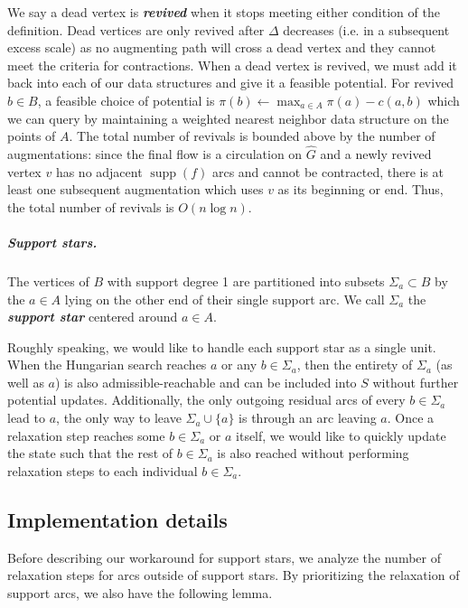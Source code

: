 \documentclass[a4paper,UKenglish]{socg-lipics-v2018}
\def\supp{\operatorname{supp}}
\theoremstyle{plain}
\numberwithin{figure}{section}
\renewcommand{\paragraph}{\subparagraph}
\def\EMPH#1{\textbf{\emph{\boldmath #1}}}
\begin{document}
We say a dead vertex is \EMPH{revived} when it stops meeting either condition
of the definition.
Dead vertices are only revived after $\Delta$ decreases (i.e. in a
subsequent excess scale) as no augmenting path will cross a dead vertex and
they cannot meet the criteria for contractions.
When a dead vertex is revived, we must add it back into each of our data
structures and give it a feasible potential.
For revived $b \in B$, a feasible choice of potential is
$\pi(b) \gets \max_{a \in A} \pi(a) - c(a, b)$ which we can query by
maintaining a weighted nearest neighbor data structure on the points of $A$.
The total number of revivals is bounded above by the number of augmentations:
since the final flow is a circulation on $\hat{G}$ and a newly revived vertex
$v$ has no adjacent $\supp(f)$ arcs and cannot be contracted, there is at least
one subsequent augmentation which uses $v$ as its beginning or end.
Thus, the total number of revivals is $O(n\log n)$.

\paragraph{Support stars.}
The vertices of $B$ with support degree 1 are partitioned into subsets
$\Sigma_a \subset B$ by the $a \in A$ lying on the other end of their single
support arc.
We call $\Sigma_a$ the \EMPH{support star} centered around $a \in A$.

Roughly speaking, we would like to handle each support star as a single unit.
When the Hungarian search reaches $a$ or any $b \in \Sigma_a$, then the
entirety of $\Sigma_a$ (as well as $a$) is also admissible-reachable and can be
included into $S$ without further potential updates.
Additionally, the only outgoing residual arcs of every $b \in \Sigma_a$ lead to
$a$, the only way to leave $\Sigma_a \cup \{a\}$ is through an arc leaving $a$.
Once a relaxation step reaches some $b \in \Sigma_a$ or $a$ itself, we would
like to quickly update the state such that the rest of $b \in \Sigma_a$ is also
reached without performing relaxation steps to each individual
$b \in \Sigma_a$.

\subsection{Implementation details}

Before describing our workaround for support stars, we analyze the number of
relaxation steps for arcs outside of support stars.
By prioritizing the relaxation of support arcs, we also have the following
lemma.
\end{document}
